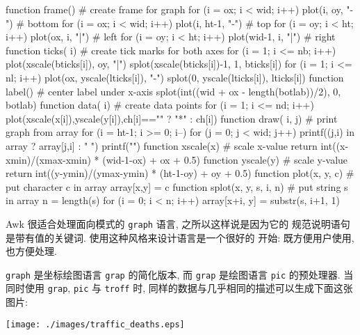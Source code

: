 \begin{awkcode}
    function frame() {        # create frame for graph
        for (i = ox; i < wid; i++) plot(i, oy, "-")     # bottom
        for (i = ox; i < wid; i++) plot(i, ht-1, "-")   # top
        for (i = oy; i < ht; i++) plot(ox, i, "|")      # left
        for (i = oy; i < ht; i++) plot(wid-1, i, "|")   # right
    }
    function ticks(    i) {   # create tick marks for both axes
        for (i = 1; i <= nb; i++) {
            plot(xscale(bticks[i]), oy, "|")
            splot(xscale(bticks[i])-1, 1, bticks[i])
        }
        for (i = 1; i <= nl; i++) {
            plot(ox, yscale(lticks[i]), "-")
            splot(0, yscale(lticks[i]), lticks[i])
        }
    }
    function label() {        # center label under x-axis
        splot(int((wid + ox - length(botlab))/2), 0, botlab)
    }
    function data(    i) {    # create data points
        for (i = 1; i <= nd; i++)
            plot(xscale(x[i]),yscale(y[i]),ch[i]=="" ? "*" : ch[i])
    }
    function draw(    i, j) { # print graph from array
        for (i = ht-1; i >= 0; i--) {
            for (j = 0; j < wid; j++)
                printf((j,i) in array ? array[j,i] : " ")
            printf("\n")
        }
    }
    function xscale(x) {      # scale x-value
        return int((x-xmin)/(xmax-xmin) * (wid-1-ox) + ox + 0.5)
    }
    function yscale(y) {      # scale y-value
        return int((y-ymin)/(ymax-ymin) * (ht-1-oy) + oy + 0.5)
    }
    function plot(x, y, c) {  # put character c in array
        array[x,y] = c
    }
    function splot(x, y, s,    i, n) { # put string s in array
        n = length(s)
        for (i = 0; i < n; i++)
            array[x+i, y] = substr(s, i+1, 1)
    }
\end{awkcode}

Awk 很适合处理面向模式的 \texttt{graph} 语言, 之所以这样说是因为它的
规范说明语句是带有值的关键词. 使用这种风格来设计语言是一个很好的
开始: 既方便用户使用, 也方便处理.

\texttt{graph} 是坐标绘图语言 \texttt{grap} 的简化版本, 而 \texttt{grap}
是绘图语言 \texttt{pic} 的预处理器. 
 当同时使用 \texttt{grap}, \texttt{pic} 与 \texttt{troff}
时, 同样的数据与几乎相同的描述可以生成下面这张图片:
%
\begin{center}
    \texttt{[image: ./images/traffic\_deaths.eps]}
\end{center}


